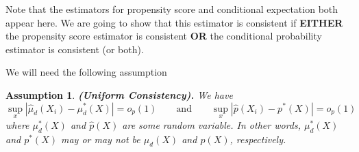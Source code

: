 \documentclass[11pt,a4paper]{amsart}
\theoremstyle{plain}
\newtheorem{assumption}{Assumption}
\theoremstyle{definition}
\begin{document}
	Note that the estimators for propensity score and conditional expectation both appear here. We are going to show that this estimator is consistent if \textbf{EITHER} the propensity score estimator is consistent \textbf{OR} the conditional probability estimator is consistent (or both).\par 
	We will need the following assumption 
	\begin{assumption}
		\textbf{(Uniform Consistency).} We have 
		\[	\sup_{x} \left| \hat{\mu}_{d}(X_{i}) - \mu_{d}^{*}(X) \right| = o_{p}(1) \qquad \text{and} \qquad \sup_{x} \left| \hat{p}(X_{i}) - p^{*}(X) \right| = o_{p}(1) 	\]
		where $\mu_{d}^{*}(X)$ and $\hat{p}(X)$ are some random variable. In other words, $\mu_{d}^{*}(X)$ and $p^{*}(X)$ may or may not be $\mu_{d}(X)$ and $p(X)$, respectively.
	\end{assumption}
\end{document}
